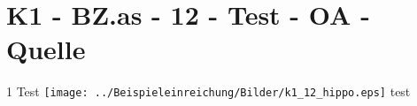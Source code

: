 \section{K1 - BZ.as - 12 - Test - OA - Quelle}

\begin{langesbeispiel} \item[1] %
Test \texttt{[image: ../Beispieleinreichung/Bilder/k1\_12\_hippo.eps]} test
\end{langesbeispiel}